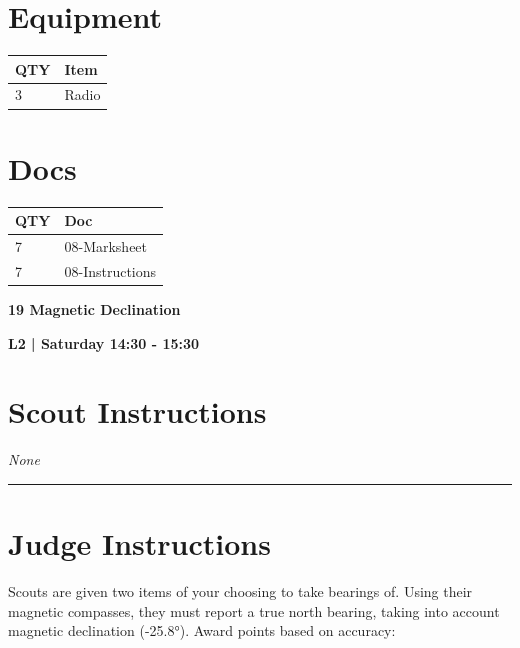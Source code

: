 \documentclass[10pt]{article}
\newcommand{\newtitle}[1]{\begin{center}{\Huge\bfseries #1 }\\ \vspace{5mm}\end{center}}
\newcommand{\newsubtitle}[1]{\begin{center}{\color{grey}\Large\bfseries #1 }\\ \vspace{5mm}\end{center}}
\begin{document}
	\begin{multicols}{2}

		\section*{\faWrench \: Equipment}

		
	\begin{center}
			\begin{tabular}{p{2cm}p{4cm}}


				\textbf{QTY} & \textbf{Item} \\\toprule
												3&Radio\\\midrule
								\end{tabular}

			\end{center}

		
		\vfill\null
		\columnbreak

			\section*{\faFile \: Docs}
		 	\begin{center}
			\begin{tabular}{p{2cm}p{4cm}}

			\textbf{QTY} & \textbf{Doc} \\\toprule
										7&08-Marksheet\\\midrule
										7&08-Instructions\\\midrule
							\end{tabular}
			\end{center}
	

		\vfill\null

		\end{multicols}



	\vspace{1cm}


	\clearpage
		\newtitle{19 Magnetic Declination }
	\newsubtitle{L2 | Saturday 14:30 - 15:30}
		\setcounter{section}{18}
	\section*{Scout Instructions}
		\textit{None}
	
	\vspace{0.5cm}
	\hrule
	\vspace{0.5cm}

		\section*{Judge Instructions}
		Scouts are given two items of your choosing to take bearings of. Using their magnetic compasses, they must report a true north bearing, taking into account magnetic declination (-25.8°). Award points based on accuracy:
\end{document}

